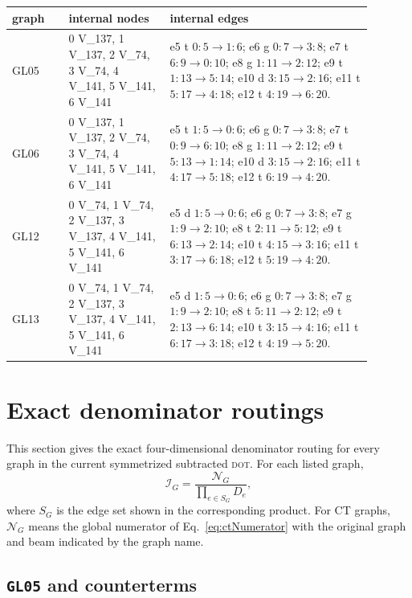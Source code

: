 \documentclass[11pt]{article}
\newcommand{\DOT}{\textsc{dot}}
\newcommand{\N}{\mathcal{N}}
\newcommand{\I}{\mathcal{I}}
\begin{document}
\begin{longtable}{>{\ttfamily}p{0.14\linewidth}p{0.25\linewidth}p{0.50\linewidth}}
\toprule
graph & internal nodes & internal edges \\
\midrule
\endhead
GL05 &
0 V\_137, 1 V\_137, 2 V\_74, 3 V\_74, 4 V\_141, 5 V\_141, 6 V\_141 &
e5 t \(0{:}5\to1{:}6\);
e6 g \(0{:}7\to3{:}8\);
e7 t \(6{:}9\to0{:}10\);
e8 g \(1{:}11\to2{:}12\);
e9 t \(1{:}13\to5{:}14\);
e10 d \(3{:}15\to2{:}16\);
e11 t \(5{:}17\to4{:}18\);
e12 t \(4{:}19\to6{:}20\).\\
\addlinespace
GL06 &
0 V\_137, 1 V\_137, 2 V\_74, 3 V\_74, 4 V\_141, 5 V\_141, 6 V\_141 &
e5 t \(1{:}5\to0{:}6\);
e6 g \(0{:}7\to3{:}8\);
e7 t \(0{:}9\to6{:}10\);
e8 g \(1{:}11\to2{:}12\);
e9 t \(5{:}13\to1{:}14\);
e10 d \(3{:}15\to2{:}16\);
e11 t \(4{:}17\to5{:}18\);
e12 t \(6{:}19\to4{:}20\).\\
\addlinespace
GL12 &
0 V\_74, 1 V\_74, 2 V\_137, 3 V\_137, 4 V\_141, 5 V\_141, 6 V\_141 &
e5 d \(1{:}5\to0{:}6\);
e6 g \(0{:}7\to3{:}8\);
e7 g \(1{:}9\to2{:}10\);
e8 t \(2{:}11\to5{:}12\);
e9 t \(6{:}13\to2{:}14\);
e10 t \(4{:}15\to3{:}16\);
e11 t \(3{:}17\to6{:}18\);
e12 t \(5{:}19\to4{:}20\).\\
\addlinespace
GL13 &
0 V\_74, 1 V\_74, 2 V\_137, 3 V\_137, 4 V\_141, 5 V\_141, 6 V\_141 &
e5 d \(1{:}5\to0{:}6\);
e6 g \(0{:}7\to3{:}8\);
e7 g \(1{:}9\to2{:}10\);
e8 t \(5{:}11\to2{:}12\);
e9 t \(2{:}13\to6{:}14\);
e10 t \(3{:}15\to4{:}16\);
e11 t \(6{:}17\to3{:}18\);
e12 t \(4{:}19\to5{:}20\).\\
\bottomrule
\end{longtable}

\section{Exact denominator routings}
\label{sec:denominatorTables}

This section gives the exact four-dimensional denominator routing for every
graph in the current symmetrized subtracted \DOT{}.  For each listed graph,
\[
  \I_G=\frac{\N_G}{\prod_{e\in S_G}D_e},
\]
where \(S_G\) is the edge set shown in the corresponding product.  For CT
graphs, \(\N_G\) means the global numerator of Eq.~\eqref{eq:ctNumerator} with
the original graph and beam indicated by the graph name.

\subsection{\texttt{GL05} and counterterms}
\end{document}
